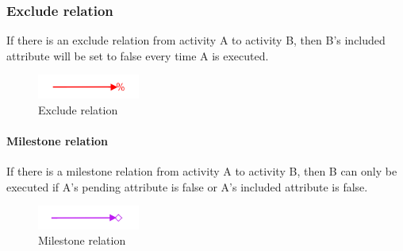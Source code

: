 \documentclass{article}
\begin{document}
	\subsubsection{Exclude relation}
	If there is an exclude relation from activity A to activity B, then B's included attribute will be set to false every time A is executed.
	\begin{figure}[h!]
		\centering
		\includegraphics[width=0.3\textwidth]{figures/ExcludeRelation.png}
	 	\caption[Exclude relation]
	 	{Exclude relation}
	\end{figure}

	\paragraph{Milestone relation}
	If there is a milestone relation from activity A to activity B, then B can only be executed if A's pending attribute is false or A's included attribute is false.
	\begin{figure}[h!]
		\centering
		\includegraphics[width=0.3\textwidth]{figures/MilestoneRelation.png}
	 	\caption[Milestone relation]
	 	{Milestone relation}
	\end{figure}
\end{document}
